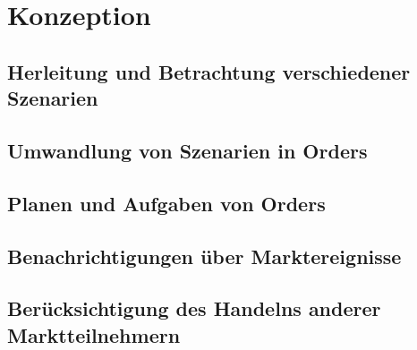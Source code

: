 \chapter{Konzeption}
\section{Herleitung und Betrachtung verschiedener Szenarien}
\section{Umwandlung von Szenarien in Orders}
\section{Planen und Aufgaben von Orders}
\section{Benachrichtigungen über Marktereignisse}
\section{Berücksichtigung des Handelns anderer Marktteilnehmern}